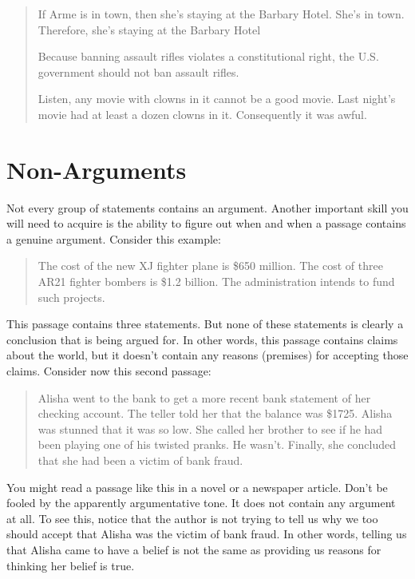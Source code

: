 \documentclass[report,oneside]{memoir}
\begin{document}
\begin{quote}

If Arme is in town, then she's staying at the Barbary Hotel. She's in town. Therefore, she's staying at the Barbary Hotel

Because banning assault rifles violates a constitutional right, the U.S. government should not ban assault rifles.

Listen, any movie with clowns in it cannot be a good movie. Last night's movie had at least a dozen clowns in it. Consequently it was awful.
\end{quote}
\section{Non-Arguments}
\label{non-arguments}

Not every group of statements contains an argument. Another important skill you will need to acquire is the ability to figure out when and when a passage contains a genuine argument. Consider this example: 

\begin{quote}

The cost of the new XJ fighter plane is \$650 million. The cost of three AR21 fighter bombers is \$1.2 billion. The administration intends to fund such projects.
\end{quote}
This passage contains three statements. But none of these statements is clearly a conclusion that is being argued for. In other words, this passage contains claims about the world, but it doesn't contain any reasons (premises) for accepting those claims. Consider now this second passage:

\begin{quote}

Alisha went to the bank to get a more recent bank statement of her checking account. The teller told her that the balance was \$1725. Alisha was stunned that it was so low. She called her brother to see if he had been playing one of his twisted pranks. He wasn't. Finally, she concluded that she had been a victim of bank fraud.
\end{quote}
You might read a passage like this in a novel or a newspaper article. Don't be fooled by the apparently argumentative tone. It does not contain any argument at all. To see this, notice that the author is not trying to tell us why we too should accept that Alisha was the victim of bank fraud. In other words, telling us that Alisha came to have a belief is not the same as providing us reasons for thinking her belief is true. 
\end{document}

